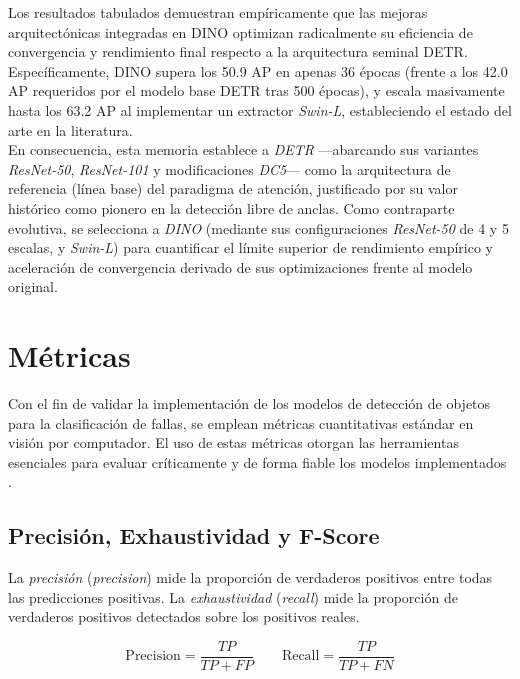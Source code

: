 Los resultados tabulados demuestran empíricamente que las mejoras arquitectónicas integradas en DINO optimizan radicalmente su eficiencia de convergencia y rendimiento final respecto a la arquitectura seminal DETR. Específicamente, DINO supera los 50.9 AP en apenas 36 épocas (frente a los 42.0 AP requeridos por el modelo base DETR tras 500 épocas), y escala masivamente hasta los 63.2 AP al implementar un extractor \textit{Swin-L}, estableciendo el estado del arte en la literatura. \\

En consecuencia, esta memoria establece a \textit{DETR} ---abarcando sus variantes \textit{ResNet-50}, \textit{ResNet-101} y modificaciones \textit{DC5}--- como la arquitectura de referencia (línea base) del paradigma de atención, justificado por su valor histórico como pionero en la detección libre de anclas. Como contraparte evolutiva, se selecciona a \textit{DINO} (mediante sus configuraciones \textit{ResNet-50} de 4 y 5 escalas, y \textit{Swin-L}) para cuantificar el límite superior de rendimiento empírico y aceleración de convergencia derivado de sus optimizaciones frente al modelo original.\\


\section{Métricas}

\par Con el fin de validar la implementación de los modelos de detección de objetos para la clasificación de fallas, se emplean métricas cuantitativas estándar en visión por computador. El uso de estas métricas otorgan las herramientas esenciales para evaluar críticamente y de forma fiable los modelos implementados \cite{schlosser2024overview}.

\subsection{Precisión, Exhaustividad y F-Score}

\par La \textit{precisión} (\textit{precision}) mide la proporción de verdaderos positivos entre todas las predicciones positivas. La \textit{exhaustividad} (\textit{recall}) mide la proporción de verdaderos positivos detectados sobre los positivos reales. 

\[
\text{Precision} = \frac{TP}{TP + FP} \quad \quad \text{Recall} = \frac{TP}{TP + FN}
\]


